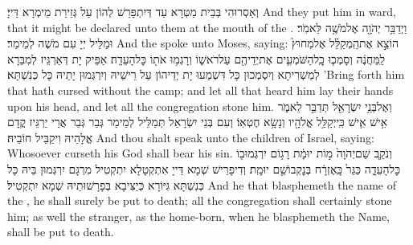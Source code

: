 {וְאַסְרוּהִי בְּבֵית מַטְּרָא עַד דְּיִתְפָּרַשׁ לְהוֹן עַל גְּזֵירַת מֵימְרָא דַּייָ׃}
{And they put him in ward, that it might be declared unto them at the mouth of the \lord.}{}
{וַיְדַבֵּ֥ר יְהֹוָ֖ה אֶל\maqqaf מֹשֶׁ֥ה לֵּאמֹֽר׃}
{וּמַלֵּיל יְיָ עִם מֹשֶׁה לְמֵימַר׃}
{And the \lord\space spoke unto Moses, saying:}{}
{הוֹצֵ֣א אֶת\maqqaf הַֽמְקַלֵּ֗ל אֶל\maqqaf מִחוּץ֙ לַֽמַּחֲנֶ֔ה וְסָמְכ֧וּ כׇֽל\maqqaf הַשֹּׁמְעִ֛ים אֶת\maqqaf יְדֵיהֶ֖ם עַל\maqqaf רֹאשׁ֑וֹ וְרָגְמ֥וּ אֹת֖וֹ כׇּל\maqqaf הָעֵדָֽה׃}
{אַפֵּיק יָת דְּאַרְגֵּיז לְמִבַּרָא לְמַשְׁרִיתָא וְיִסְמְכוּן כָּל דִּשְׁמַעוּ יָת יְדֵיהוֹן עַל רֵישֵׁיהּ וְיִרְגְּמוּן יָתֵיהּ כָּל כְּנִשְׁתָּא׃}
{’Bring forth him that hath cursed without the camp; and let all that heard him lay their hands upon his head, and let all the congregation stone him.}{}
{וְאֶל\maqqaf בְּנֵ֥י יִשְׂרָאֵ֖ל תְּדַבֵּ֣ר לֵאמֹ֑ר אִ֥ישׁ אִ֛ישׁ כִּֽי\maqqaf יְקַלֵּ֥ל אֱלֹהָ֖יו וְנָשָׂ֥א חֶטְאֽוֹ׃}
{וְעִם בְּנֵי יִשְׂרָאֵל תְּמַלֵּיל לְמֵימַר גְּבַר גְּבַר אֲרֵי יַרְגֵּיז קֳדָם אֱלָהֵיהּ וִיקַבֵּיל חוֹבֵיהּ׃}
{And thou shalt speak unto the children of Israel, saying: Whosoever curseth his God shall bear his sin.}{}
{וְנֹקֵ֤ב שֵׁם\maqqaf יְהֹוָה֙ מ֣וֹת יוּמָ֔ת רָג֥וֹם יִרְגְּמוּ\maqqaf ב֖וֹ כׇּל\maqqaf הָעֵדָ֑ה כַּגֵּר֙ כָּֽאֶזְרָ֔ח בְּנׇקְבוֹ\maqqaf שֵׁ֖ם יוּמָֽת׃}
{וְדִיפָרֵישׁ שְׁמָא דַּייָ אִתְקְטָלָא יִתְקְטִיל מִרְגָּם יִרְגְּמוּן בֵּיהּ כָּל כְּנִשְׁתָּא גִּיּוֹרָא כְּיַצִּיבָא בְּפָרָשׁוּתֵיהּ שְׁמָא יִתְקְטִיל׃}
{And he that blasphemeth the name of the \lord, he shall surely be put to death; all the congregation shall certainly stone him; as well the stranger, as the home-born, when he blasphemeth the Name, shall be put to death.}{}
